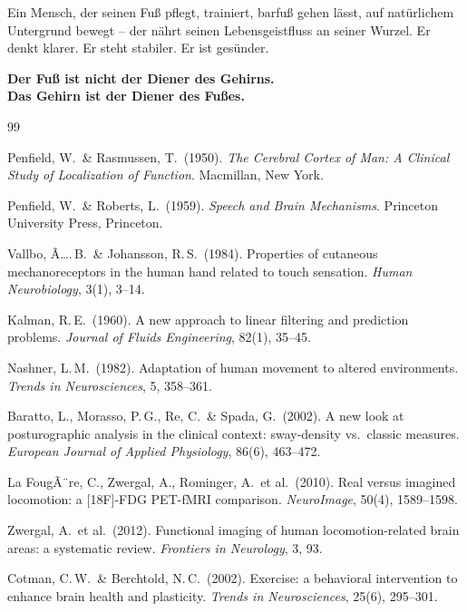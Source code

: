﻿\documentclass[12pt,a4paper]{report}
\theoremstyle{plain}
\theoremstyle{definition}
\theoremstyle{remark}
\begin{document}
Ein Mensch, der seinen Fuß pflegt, trainiert, barfuß gehen
lässt, auf natürlichem Untergrund bewegt -- der nährt seinen
Lebensgeistfluss an seiner Wurzel. Er denkt klarer. Er steht
stabiler. Er ist gesünder.

\textbf{Der Fuß ist nicht der Diener des Gehirns.\\
Das Gehirn ist der Diener des Fußes.}

\begin{thebibliography}{99}

Penfield, W.\ \& Rasmussen, T.\ (1950).
\textit{The Cerebral Cortex of Man: A Clinical Study of Localization of Function}.
Macmillan, New York.

Penfield, W.\ \& Roberts, L.\ (1959).
\textit{Speech and Brain Mechanisms}.
Princeton University Press, Princeton.

Vallbo, Ã….\,B.\ \& Johansson, R.\,S.\ (1984).
Properties of cutaneous mechanoreceptors in the human hand related to touch sensation.
\textit{Human Neurobiology}, 3(1), 3--14.

Kalman, R.\,E.\ (1960).
A new approach to linear filtering and prediction problems.
\textit{Journal of Fluids Engineering}, 82(1), 35--45.

Nashner, L.\,M.\ (1982).
Adaptation of human movement to altered environments.
\textit{Trends in Neurosciences}, 5, 358--361.

Baratto, L., Morasso, P.\,G., Re, C.\ \& Spada, G.\ (2002).
A new look at posturographic analysis in the clinical context: sway-density vs.\ classic measures.
\textit{European Journal of Applied Physiology}, 86(6), 463--472.

La FougÃ¨re, C., Zwergal, A., Rominger, A.\ et al.\ (2010).
Real versus imagined locomotion: a [18F]-FDG PET-fMRI comparison.
\textit{NeuroImage}, 50(4), 1589--1598.

Zwergal, A.\ et al.\ (2012).
Functional imaging of human locomotion-related brain areas: a systematic review.
\textit{Frontiers in Neurology}, 3, 93.

Cotman, C.\,W.\ \& Berchtold, N.\,C.\ (2002).
Exercise: a behavioral intervention to enhance brain health and plasticity.
\textit{Trends in Neurosciences}, 25(6), 295--301.


\end{thebibliography}
\end{document}
